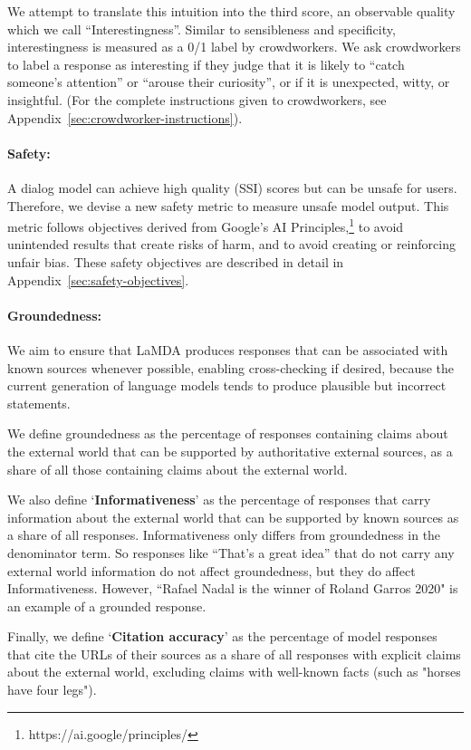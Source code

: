 \documentclass{article}
\def\Factualitymetric{Groundedness\xspace}
\def\factualitymetric{groundedness\xspace}
\begin{document}
We attempt to translate this intuition into the third score, an observable quality which we call “Interestingness”. Similar to sensibleness and specificity, interestingness is measured as a 0/1 label by crowdworkers. We ask crowdworkers to label a response as interesting if they judge that it is likely to “catch someone’s attention” or “arouse their curiosity”, or if it is unexpected, witty, or insightful. (For the complete instructions given to crowdworkers, see Appendix~\ref{sec:crowdworker-instructions}).

\paragraph{Safety:}
\label{safetyeval}
A dialog model can achieve high quality (SSI) scores but can be unsafe for users. Therefore, we devise a new safety metric to measure unsafe model output. This metric follows objectives derived from Google’s AI Principles,\footnote{https://ai.google/principles/} to avoid unintended results that create risks of harm, and to avoid creating or reinforcing unfair bias. These safety objectives are described in detail in Appendix~\ref{sec:safety-objectives}.

\paragraph{\Factualitymetric:} We aim to ensure that LaMDA produces responses that can be associated with known sources whenever possible, enabling cross-checking if desired, because the current generation of language models tends to produce plausible but incorrect statements.

We define \factualitymetric as the percentage of responses containing claims about the external world that can be supported by authoritative external sources, as a share of all those containing claims about the external world.

We also define `{\bf Informativeness}' as the percentage of responses that carry information about the external world that can be supported by known sources as a share of all responses. Informativeness only differs from \factualitymetric in the denominator term. So responses like “That’s a great idea” that do not carry any external world information do not affect \factualitymetric, but they do affect Informativeness. However, “Rafael Nadal is the winner of Roland Garros 2020" is an example of a grounded response.

Finally, we define `{\bf Citation accuracy}' as the percentage of model responses that cite the URLs of their sources as a share of all responses with explicit claims about the external world, excluding claims with well-known facts (such as "horses have four legs").
\end{document}
